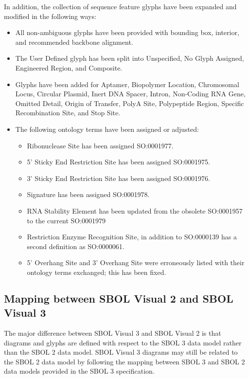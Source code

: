 In addition, the collection of sequence feature glyphs have been expanded and modified in the following ways:
\begin{itemize}
\item All non-ambiguous glyphs have been provided with bounding box, interior, and recommended backbone alignment.
\item The User Defined glyph has been split into Unspecified, No Glyph Assigned, Engineered Region, and Composite. 
\item Glyphs have been added for Aptamer, Biopolymer Location, Chromosomal Locus, Circular Plasmid, Inert DNA Spacer, Intron, Non-Coding RNA Gene, Omitted Detail, Origin of Transfer, PolyA Site, Polypeptide Region, Specific Recombination Site, and Stop Site.
\item The following ontology terms have been assigned or adjusted: 
	\begin{itemize}
	\item Ribonuclease Site has been assigned SO:0001977.
	\item 5' Sticky End Restriction Site has been assigned SO:0001975.
	\item 3' Sticky End Restriction Site has been assigned SO:0001976.
	\item Signature has been assigned SO:0001978.
	\item RNA Stability Element has been updated from the obsolete SO:0001957 to the current SO:0001979
	\item Restriction Enzyme Recognition Site, in addition to SO:0000139 has a second definition as SO:0000061.
	\item 5' Overhang Site and 3' Overhang Site were erroneously listed with their ontology terms exchanged; this has been fixed.
	\end{itemize}
\end{itemize}

\subsection{Mapping between SBOL Visual 2 and SBOL Visual 3}\label{sec:sbol2}

The major difference between SBOL Visual 3 and SBOL Visual 2 is that diagrams and glyphs are defined with respect to the SBOL 3 data model rather than the SBOL 2 data model.
SBOL Visual 3 diagrams may still be related to the SBOL 2 data model by following the mapping between SBOL 3 and SBOL 2 data models provided in the SBOL 3 specification.

